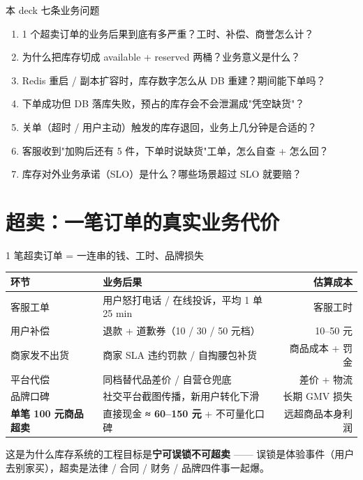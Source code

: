 \documentclass[aspectratio=169,11pt]{beamer}
\begin{document}
\begin{frame}[shrink]{本 deck 七条业务问题}
\begin{enumerate}
  \item 1 个超卖订单的业务后果到底有多严重？工时、补偿、商誉怎么计？
  \item 为什么把库存切成 available + reserved 两桶？业务意义是什么？
  \item Redis 重启 / 副本扩容时，库存数字怎么从 DB 重建？期间能下单吗？
  \item 下单成功但 DB 落库失败，预占的库存会不会泄漏成"凭空缺货"？
  \item 关单（超时 / 用户主动）触发的库存退回，业务上几分钟是合适的？
  \item 客服收到"加购后还有 5 件，下单时说缺货"工单，怎么自查 + 怎么回？
  \item 库存对外业务承诺（SLO）是什么？哪些场景超过 SLO 就要赔？
\end{enumerate}
\end{frame}

\section{超卖：一笔订单的真实业务代价}

\begin{frame}[shrink]{1 笔超卖订单 = 一连串的钱、工时、品牌损失}
\begin{tabular}{@{}lp{4.6cm}r@{}}
\toprule
环节 & 业务后果 & 估算成本 \\
\midrule
客服工单         & 用户怒打电话 / 在线投诉，平均 1 单 25 min & 客服工时 \\
用户补偿         & 退款 + 道歉券（10 / 30 / 50 元档）        & 10--50 元 \\
商家发不出货     & 商家 SLA 违约罚款 / 自掏腰包补货          & 商品成本 + 罚金 \\
平台代偿         & 同档替代品差价 / 自营仓兜底              & 差价 + 物流 \\
品牌口碑         & 社交平台截图传播，新用户转化下滑           & 长期 GMV 损失 \\
\midrule
\textbf{单笔 100 元商品超卖} & 直接现金 \textbf{≈ 60--150 元} + 不可量化口碑 & 远超商品本身利润 \\
\bottomrule
\end{tabular}
\vspace{2mm}
\small 这是为什么库存系统的工程目标是\textbf{宁可误锁不可超卖} —— 误锁是体验事件（用户去别家买），超卖是法律 / 合同 / 财务 / 品牌四件事一起爆。
\end{frame}
\end{document}
